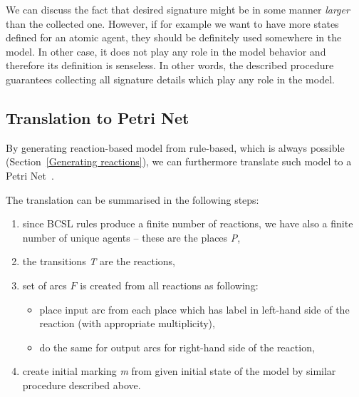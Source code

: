 \documentclass[12pt]{fithesis2}
\newenvironment{proof}{\noindent\emph{Proof:~ }\nopagebreak \begin{itshape}}{\end{itshape}\bigskip}
\newcommand*{\QEDA}{\hfill\ensuremath{\blacksquare}}%
\begin{document}
We can discuss the fact that desired signature might be in some manner \emph{larger} than the collected one. However, if for example we want to have more states defined for an atomic agent, they should be definitely used somewhere in the model. In other case, it does not play any role in the model behavior and therefore its definition is senseless. In other words, the described procedure guarantees collecting all signature details which play any role in the model.


\subsection{Translation to Petri Net}

By generating reaction-based model from rule-based, which is always possible (Section~\ref{Generating reactions}), we can furthermore translate such model to a Petri Net~\cite{petri}.

The translation can be summarised in the following steps: 

\begin{enumerate}
\item since BCSL rules produce a finite number of reactions, we have also a finite number of unique agents -- these are the places \emph{P},
\item the transitions \emph{T} are the reactions,
\item set of arcs $F$ is created from all reactions as following:
\begin{itemize}
  \item place input arc from each place which has label in left-hand side of the reaction (with appropriate multiplicity),
  \item do the same for output arcs for right-hand side of the reaction,
\end{itemize}
\item create initial marking \emph{m} from given initial state of the model by similar procedure described above.
\end{enumerate}
\end{document}
